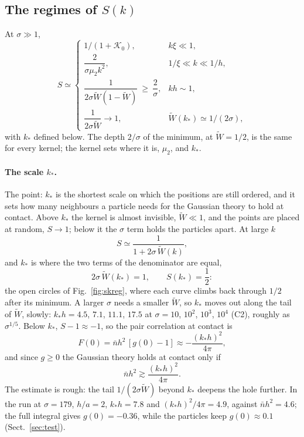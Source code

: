 \documentclass[11pt,aps,preprint,nofootinbib,superscriptaddress,tightenlines]{revtex4-2}
\def\st{\begin{equation}}
\def\stp{\end{equation}}
\def\Sect#1{Sect.~\ref{#1}}
\def\Fig#1{Fig.~\ref{#1}}
\let\oldparagraph\paragraph
\renewcommand{\paragraph}{\par\bigskip\oldparagraph}
\begin{document}
\subsection{The regimes of $S(k)$}

At $\sigma\gg1$,
\st
S\simeq\begin{cases}
1/(1+\mathcal K_0), & k\xi\ll1,\\[1ex]
\dfrac{2}{\sigma\mu_2k^2}, & 1/\xi\ll k\ll1/h,\\[2ex]
\dfrac1{2\sigma\widetilde W(1-\widetilde W)}\ \ge\ \dfrac2\sigma, & kh\sim1,\\[2ex]
\dfrac1{2\sigma\widetilde W}\to1, & \widetilde W(k_*)\simeq1/(2\sigma),
\end{cases}
\stp
with $k_*$ defined below.  The depth $2/\sigma$ of the minimum, at $\widetilde W=1/2$, is the same for every kernel; the kernel sets where it is,
$\mu_2$, and $k_*$.

\paragraph{The scale $k_*$.}  The point: $k_*$ is the shortest scale on which the positions are still ordered, and it sets how many neighbours a
particle needs for the Gaussian theory to hold at contact.  Above $k_*$ the kernel is almost invisible, $\widetilde W\ll1$, and the points are placed
at random, $S\to1$; below it the $\sigma$ term holds the particles apart.  At large $k$
\st
S\simeq\frac1{1+2\sigma\,\widetilde W(k)} ,
\stp
and $k_*$ is where the two terms of the denominator are equal,
\st
2\sigma\,\widetilde W(k_*)=1,\qquad S(k_*)=\frac12 :
\label{kstar}
\stp
the open circles of \Fig{fig:skreg}, where each curve climbs back through $1/2$ after its minimum.  A larger $\sigma$ needs a smaller $\widetilde W$,
so $k_*$ moves out along the tail of $\widetilde W$, slowly: $k_*h=4.5$, $7.1$, $11.1$, $17.5$ at $\sigma=10$, $10^2$, $10^3$, $10^4$ (C2), roughly as
$\sigma^{1/5}$.  Below $k_*$, $S-1\approx-1$, so the pair correlation at contact is
\st
F(0)=\bar nh^2\,[g(0)-1]\approx-\frac{(k_*h)^2}{4\pi} ,
\stp
and since $g\ge0$ the Gaussian theory holds at contact only if
\st
\bar nh^2\gtrsim\frac{(k_*h)^2}{4\pi} .
\stp
The estimate is rough: the tail $1/(2\sigma\widetilde W)$ beyond $k_*$ deepens the hole further.  In the run at $\sigma=179$, $h/a=2$, $k_*h=7.8$ and
$(k_*h)^2/4\pi=4.9$, against $\bar nh^2=4.6$; the full integral gives $g(0)=-0.36$, while the particles keep $g(0)\approx0.1$ (\Sect{sec:test}).
\end{document}
